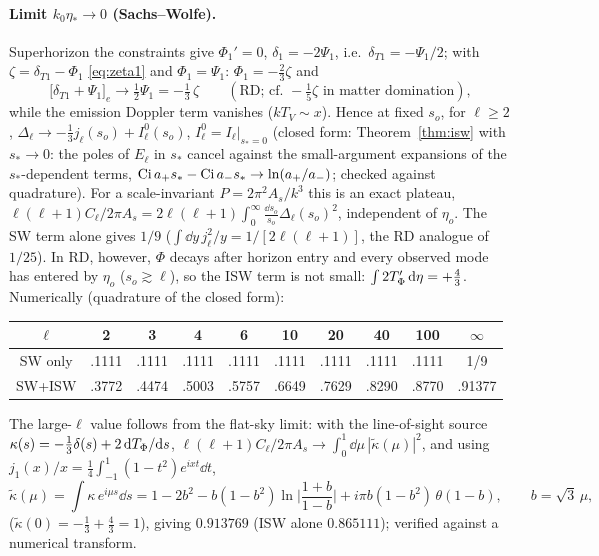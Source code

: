 \paragraph{Limit $k_0\eta_*\to0$ (Sachs--Wolfe).}  Superhorizon the constraints give $\Phi_1'=0$, $\delta_1=-2\Psi_1$, i.e.\
$\delta_{T1}=-\Psi_1/2$; with $\zeta=\delta_{T1}-\Phi_1$ \eqref{eq:zeta1} and $\Phi_1=\Psi_1$: $\Phi_1=-\tfrac23\zeta$ and
\begin{equation}
\big[\delta_{T1}+\Psi_1\big]_e\to\tfrac12\Psi_1=-\tfrac13\,\zeta\qquad(\text{RD; cf.\ }-\tfrac15\zeta\text{ in matter domination}),
\end{equation}
while the emission Doppler term vanishes ($kT_V\sim x$).  Hence at fixed $s_o$, for $\ell\ge2$,
$\Delta_\ell\to-\tfrac13j_\ell(s_o)+I^0_\ell(s_o)$, $I^0_\ell=I_\ell|_{s_*=0}$ (closed form: Theorem~\ref{thm:isw} with
$s_*\to0$: the poles of $E_\ell$ in $s_*$ cancel against the small-argument expansions of the $s_*$-dependent terms,
$\operatorname{Ci} a_+s_*-\operatorname{Ci} a_-s_*\to\ln(a_+/a_-)$; checked against quadrature).
For a scale-invariant $P=2\pi^2A_s/k^3$ this is an exact plateau, $\ell(\ell+1)C_\ell/2\pi A_s=2\ell(\ell+1)\int_0^\infty\frac{\dd s_o}{s_o}\Delta_\ell(s_o)^2$,
independent of $\eta_o$.  The SW term alone gives $1/9$ ($\int\dd y\,j_\ell^2/y=1/[2\ell(\ell+1)]$, the RD analogue of $1/25$).
In RD, however, $\Phi$ decays after horizon entry and every observed mode has entered by $\eta_o$ ($s_o\gtrsim\ell$), so the ISW term is
not small: $\int2T_\Phi'\,\mathrm d\eta=+\tfrac43$.  Numerically (quadrature of the closed form):
\begin{center}
\begin{tabular}{c|ccccccccc}
$\ell$ & 2 & 3 & 4 & 6 & 10 & 20 & 40 & 100 & $\infty$\\\hline
SW only & .1111 & .1111 & .1111 & .1111 & .1111 & .1111 & .1111 & .1111 & 1/9\\
SW+ISW & .3772 & .4474 & .5003 & .5757 & .6649 & .7629 & .8290 & .8770 & .91377
\end{tabular}
\end{center}
The large-$\ell$ value follows from the flat-sky limit: with the line-of-sight source $\kappa(s)=-\tfrac13\delta(s)+2\,\mathrm dT_\Phi/\mathrm d s$,
$\ell(\ell+1)C_\ell/2\pi A_s\to\int_0^1\dd\mu\,|\tilde\kappa(\mu)|^2$, and using $j_1(x)/x=\frac14\int_{-1}^1(1-t^2)e^{ixt}\dd t$,
\begin{equation}
\tilde\kappa(\mu)=\int \kappa\, e^{i\mu s}\dd s=1-2b^2-b(1-b^2)\ln\Big|\frac{1+b}{1-b}\Big|+i\pi b(1-b^2)\,\theta(1-b),\qquad b=\sqrt3\,\mu ,
\end{equation}
($\tilde\kappa(0)=-\tfrac13+\tfrac43=1$), giving $0.913769$ (ISW alone $0.865111$); verified against a numerical transform.

